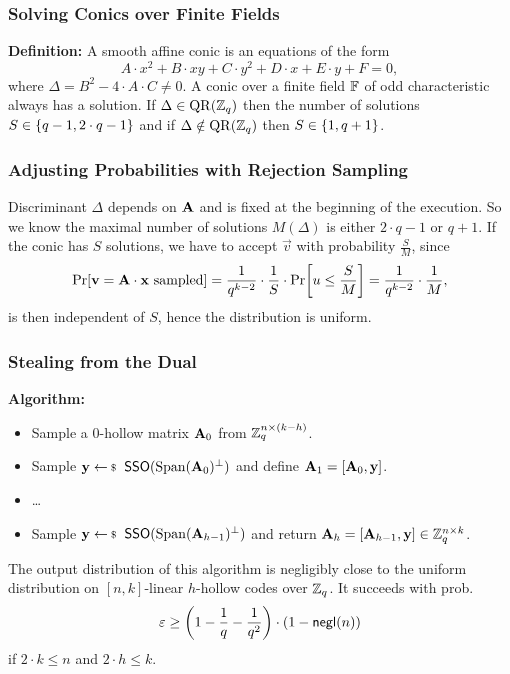 \documentclass[xcolor=table,10pt,aspectratio=169]{beamer}
\begin{document}
\begin{frame}
  \frametitle{Solving Conics over Finite Fields}
    \textbf{Definition:} A smooth affine conic is an equations of the form
    \[
      A \cdot x^2 + B \cdot xy + C \cdot y^2 + D \cdot x + E \cdot y + F = 0,
    \]
    where \(\Delta = B^2 - 4 \cdot A \cdot C \neq 0\).
  \vfill
   A conic over a finite field \(\mathbb{F}\) of odd characteristic always has a solution. If \(\Delta \in \operatorname{QR}(\mathbb{Z}_q)\) then the number of solutions \(S \in \left\{q-1, 2\cdot q - 1\right\}\) and if \(\Delta \notin \operatorname{QR}(\mathbb{Z}_q)\) then \(S \in \left\{1, q+1\right\}\).
\end{frame}

\begin{frame}
  \frametitle{Adjusting Probabilities with Rejection Sampling}
    Discriminant \(\Delta\) depends on \(\mathbf{A}\) and is fixed at the beginning of the execution. So we know the maximal number of solutions \(M(\Delta)\) is either \(2\cdot q - 1\) or \(q+1\).
  \vfill
    If the conic has \(S\) solutions, we have to accept \(\vec{v}\) with probability \(\frac{S}{M}\), since
    \[
      \prob{\vec{v} = \mat{A}\cdot\vec{x} \text{ sampled}}
      = \frac{1}{q^{k-2}} \cdot \frac{1}{S} \cdot \prob{u \leq \frac{S}{M}}
      = \frac{1}{q^{k-2}} \cdot \frac{1}{M},
    \]
    is then independent of \(S\), hence the distribution is uniform.
\end{frame}

\begin{frame}
  \frametitle{Stealing from the Dual}
    \textbf{Algorithm:}
    \begin{itemize}[label=\textbullet]
      \item Sample a \(0\)-hollow matrix \(\mathbf{A}_0\) from \(\mathbb{Z}_q^{n \times (k-h)}\).
      \item Sample \(\vec{y} \sample \SampleSelfOrthogonal(\Span(\mat{A}_0)^\bot)\) and define \(\mathbf{A}_1 = [\mathbf{A}_0, \mathbf{y}]\).
      \item \dots
      \item Sample \(\vec{y} \sample \SampleSelfOrthogonal(\Span(\mat{A}_{h-1})^\bot)\) and return \(\mathbf{A}_h = [\mathbf{A}_{h-1}, \mathbf{y}] \in \mathbb{Z}_q^{n \times k}\).
    \end{itemize}
  \vfill
    The output distribution of this algorithm is negligibly close to the uniform distribution on \([n,k]\)-linear \(h\)-hollow codes over \(\mathbb{Z}_q\). It succeeds with prob.
    \[
      \varepsilon \geq \left( 1 - \frac{1}{q} - \frac{1}{q^2} \right) \cdot \left( 1 - \negl[n] \right)
    \]
    if \(2 \cdot k \leq n\) and \(2 \cdot h \leq k\).
\end{frame}
\end{document}
